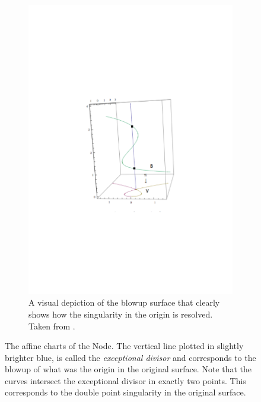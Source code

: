 \documentclass{article}
\begin{document}
\begin{example}
\begin{figure}[h!]
\begin{subfigure}[t]{0.4\textwidth}
            \end{subfigure}
            \begin{subfigure}[t]{0.4\textwidth}
                \includegraphics[width=1.0\textwidth]{pictures/blow_up_intuitive.pdf}
                \caption{A visual depiction of the blowup surface that clearly
                    shows how the singularity in the origin is resolved. Taken
                from \cite{Whi08}.}
                \label{fig:blow_up_intuitive}
            \end{subfigure}
            \caption{The affine charts of the Node. The vertical line plotted
                in slightly brighter blue, is called the \emph{exceptional
                divisor} and corresponds to the
                blowup of what was the origin in the original surface. Note
                that the curves intersect the exceptional divisor in exactly
                two points. This corresponds to the double point singularity in the
                original surface.}
            \label{fig:affine_charts_node}
        \end{figure}
    \end{example}
    
\end{document}
